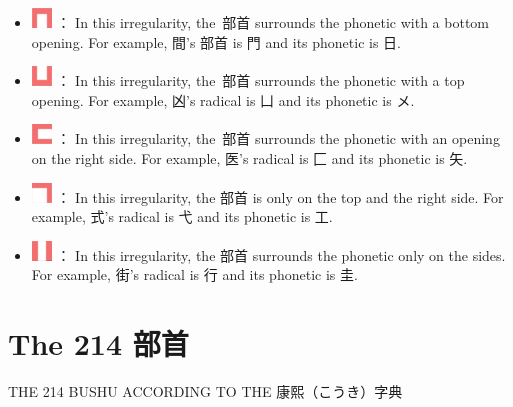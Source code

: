 \begin{itemize}

\item 
\includegraphics[scale=0.5]{figs/第08章/第359課:_the214bushu_fig/20px_Busyu___kamae(2).png}
 ： In this irregularity, the 部首 surrounds the phonetic with a bottom opening. For example, 間's 部首 is 門 and its phonetic is 日. 
\item 
\includegraphics[scale=0.5]{figs/第08章/第359課:_the214bushu_fig/20px_Busyu___kamae(3).png}
 ： In this irregularity, the 部首 surrounds the phonetic with a top opening. For example, 凶's radical is 凵 and its phonetic is メ. 
\item 
\includegraphics[scale=0.5]{figs/第08章/第359課:_the214bushu_fig/20px_Busyu___kamae(4).png}
 ： In this irregularity, the 部首 surrounds the phonetic with an opening on the right side. For example, 医's radical is 匚 and its phonetic is 矢. 
\item 
\includegraphics[scale=0.5]{figs/第08章/第359課:_the214bushu_fig/20px_Busyu___kamae(5).png}
 ： In this irregularity, the 部首 is only on the top and the right side. For example, 式's radical is 弋 and its phonetic is 工. 
\item 
\includegraphics[scale=0.5]{figs/第08章/第359課:_the214bushu_fig/20px_Busyu___kamae(6).png}
 ： In this irregularity, the 部首 surrounds the phonetic only on the sides. For example, 街's radical is 行 and its phonetic is 圭. 
\end{itemize}
      
\section{The 214 部首}
 
\begin{center}
THE 214 BUSHU ACCORDING TO THE 康熙（こうき）字典 
\end{center}

